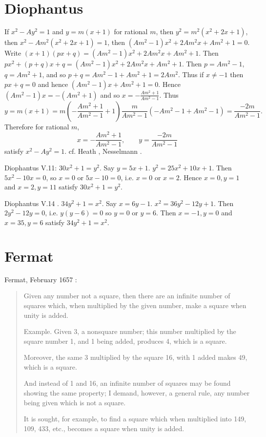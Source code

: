 \documentclass{article}
\theoremstyle{definition}
\begin{document}
\section{Diophantus}
If 
$x^2-Ay^2=1$ and 
$y=m(x+1)$ for rational $m$, then
$y^2=m^2(x^2+2x+1)$, then
$x^2-Am^2(x^2+2x+1)=1$, then
$(Am^2-1)x^2+2Am^2x+Am^2+1=0$.
 Write $(x+1)(px+q)=(Am^2-1)x^2+2Am^2x+Am^2+1$. Then
 $px^2+(p+q)x+q = (Am^2-1)x^2+2Am^2x+Am^2+1$.
 Then $p=Am^2-1$, $q=Am^2+1$,
 and so $p+q=Am^2-1+Am^2+1=2Am^2$. 
 Thus if $x \neq -1$ then $px+q=0$ and hence
 $(Am^2-1)x+Am^2+1=0$. Hence
 $(Am^2-1)x = -(Am^2+1)$ and so
 $x= - \frac{Am^2+1}{Am^2-1}$. Thus
 \[
 y=m(x+1) = m\left(- \frac{Am^2+1}{Am^2-1}+1\right)
 \frac{m}{Am^2-1}(-Am^2-1+Am^2-1)
 =\frac{-2m}{Am^2-1}.
\]
Therefore for rational $m$, 
\[
x=- \frac{Am^2+1}{Am^2-1},\qquad y = \frac{-2m}{Am^2-1}
\]
satisfy $x^2-Ay^2=1$.
cf. Heath \cite[pp.~68--69]{diophantus},
Nesselmann \cite[p.~331]{nesselmann}.

Diophantus V.11: $30x^2+1=y^2$.
Say $y=5x+1$. $y^2=25x^2+10x+1$. Then
$5x^2-10x=0$, so $x=0$ or $5x-10=0$, i.e. $x=0$ or $x=2$.
Hence $x=0,y=1$ and $x=2,y=11$ satisfy $30x^2+1=y^2$.

Diophantus V.14 \cite[pp.~211--212]{diophantus}.
$34y^2+1=x^2$.
Say $x=6y-1$. $x^2=36y^2-12y+1$. Then
$2y^2-12y=0$, i.e. $y(y-6)=0$ so $y=0$ or $y=6$. Then
$x=-1, y=0$ and $x=35, y=6$ satisfy $34y^2+1=x^2$.





\section{Fermat}
Fermat, February 1657 \cite[p.~29]{struik}:

\begin{quote}
Given any number not a square, then there are an infinite number of squares
which, when multiplied by the given number, make a square when unity is
added.

Example. Given 3, a nonsquare number; this number multiplied by the
square number 1, and 1 being added, produces 4, which is a square.

Moreover, the same 3 multiplied by the square 16, with 1 added makes 49,
which is a square.

And instead of 1 and 16, an infinite number of squares may be found showing
the same property; I demand, however, a general rule, any number being given
which is not a square.

It is sought, for example, to find a square which when multiplied into 149,
109, 433, etc., becomes a square when unity is added.
\end{quote}
\end{document}
